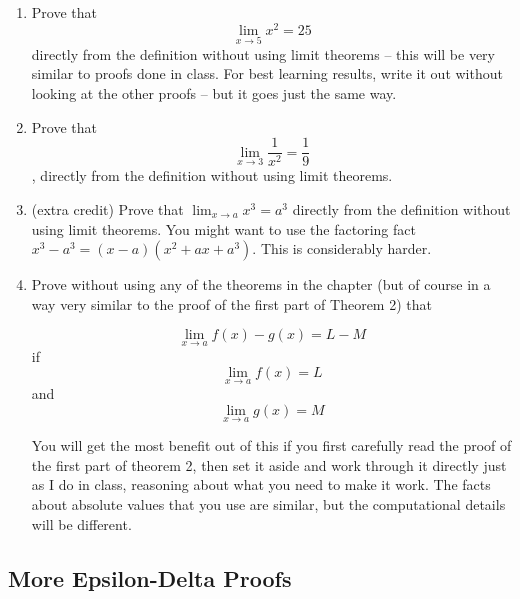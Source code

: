 \documentclass[12pt]{article}
\begin{document}
\begin{enumerate}



\item  Prove that $$\lim_{x \rightarrow 5}x^2 = 25$$ directly from the definition without using limit theorems -- this will be very similar to proofs done in class.   For best learning results, write it out without looking at the other proofs -- but it goes just the same way.

\item Prove that $$\lim_{x \rightarrow 3} \frac1{x^2}=\frac19$$, directly from the definition without using limit theorems.

\item (extra credit)  Prove that $\lim_{x \rightarrow a}x^3 = a^3$ directly from the definition without using limit theorems.  You might want to use the factoring fact $x^3-a^3 = (x-a)(x^2+ax+a^3)$.  This is considerably harder.

\item Prove without using any of the theorems in the chapter (but of course in a way very similar to the proof of the first part of Theorem 2) that

$$\lim_{x \rightarrow a} f(x)-g(x) = L-M$$ if $$\lim_{x \rightarrow a} f(x)=L$$ and  $$\lim_{x \rightarrow a} g(x)=M$$

You will get the most benefit out of this if you first carefully read the proof of the first part of theorem 2, then set it aside and work through it directly just as I do in class, reasoning about what you need to make it work.  The facts about absolute values that you use are similar, but the computational details will be different.



\end{enumerate}
\newpage

\subsection{More Epsilon-Delta Proofs}
\end{document}
